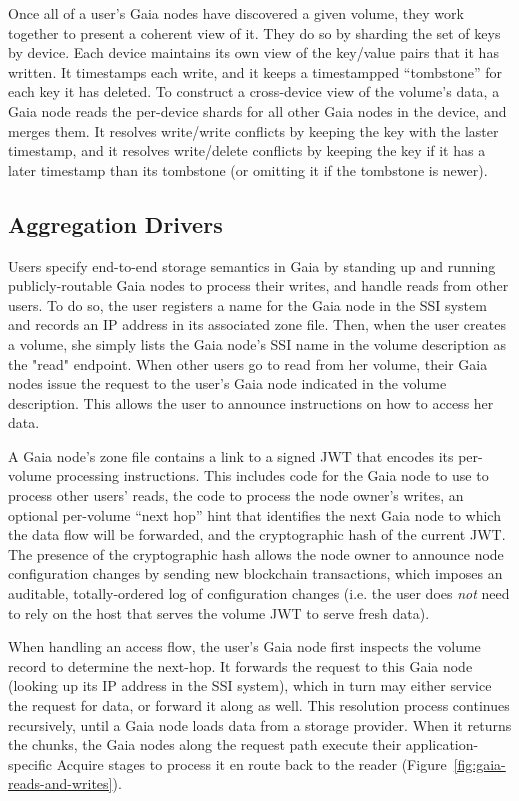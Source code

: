 Once all of a user's Gaia nodes have discovered a given volume, they work
together to present a coherent view of it.  They do so by sharding the set of
keys by device.  Each device maintains its own view of the key/value pairs that
it has written.  It timestamps each write, and it keeps a timestampped
``tombstone'' for each key it has deleted.  To construct a cross-device view of
the volume's data, a Gaia node reads the per-device shards for all other Gaia
nodes in the device, and merges them.  It resolves write/write conflicts by
keeping the key with the laster timestamp, and it resolves write/delete
conflicts by keeping the key if it has a later timestamp than its tombstone (or
omitting it if the tombstone is newer).

\subsection{Aggregation Drivers}

Users specify end-to-end storage semantics in Gaia by standing up and running
publicly-routable Gaia nodes to process their writes, and handle reads from
other users.  To do so, the user registers a name for the Gaia node in the SSI
system and records an IP address in its associated zone file.
Then, when the user creates a volume, she simply lists the Gaia node's SSI name
in the volume description as the "read" endpoint.  When other users go to
read from her volume, their Gaia nodes issue the request to the user's Gaia node
indicated in the volume description.  This allows the user to announce
instructions on how to access her data.

A Gaia node's zone file contains a link to a signed
JWT that encodes its per-volume processing instructions.
This includes code for the Gaia node to use to process other
users' reads, the code to process the node owner's writes, an optional
per-volume ``next hop'' hint that identifies the next Gaia node to which the data flow will be
forwarded, and the cryptographic hash of the
current JWT.  The presence of the cryptographic hash 
allows the node owner to announce node configuration changes
by sending new blockchain transactions, which imposes an auditable,
totally-ordered log of configuration changes (i.e. the user does \emph{not} need to
rely on the host that serves the volume JWT to serve fresh data).


When handling an access flow, the user's Gaia node first inspects the volume
record to determine the next-hop.  It
forwards the request to this Gaia node (looking up its IP address in the SSI
system), which in turn may either service the request for data, or forward it
along as well.  This resolution process continues recursively, until a Gaia node
loads data from a storage provider.  When it returns the chunks, the Gaia nodes
along the request path execute their application-specific Acquire stages to process it
en route back to the reader (Figure~\ref{fig:gaia-reads-and-writes}).

